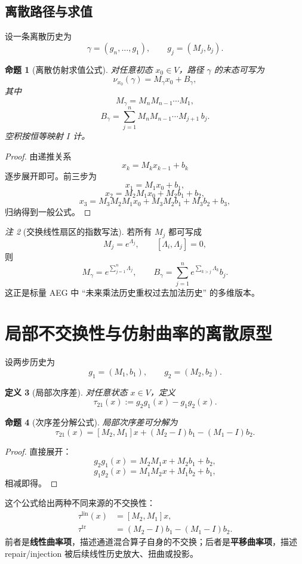 \documentclass[11pt,a4paper]{ctexart}
\newtheorem{definition}{定义}[section]
\newtheorem{proposition}[definition]{命题}
\theoremstyle{remark}
\newtheorem{remark}[definition]{注}
\begin{document}
\subsection{离散路径与求值}

设一条离散历史为
\[
\gamma=(g_n,\dots,g_1),\qquad g_j=(M_j,b_j).
\]

\begin{proposition}[离散仿射求值公式]
对任意初态 $x_0\in V$，路径 $\gamma$ 的末态可写为
\[
\nu_{x_0}(\gamma)=M_\gamma x_0+B_\gamma,
\]
其中
\[
M_\gamma=M_nM_{n-1}\cdots M_1,
\]
\[
B_\gamma=\sum_{j=1}^n M_nM_{n-1}\cdots M_{j+1}\,b_j.
\]
空积按恒等映射 $I$ 计。
\end{proposition}

\begin{proof}
由递推关系
\[
x_k=M_kx_{k-1}+b_k
\]
逐步展开即可。前三步为
\[
x_1=M_1x_0+b_1,
\]
\[
x_2=M_2M_1x_0+M_2b_1+b_2,
\]
\[
x_3=M_3M_2M_1x_0+M_3M_2b_1+M_3b_2+b_3,
\]
归纳得到一般公式。
\end{proof}

\begin{remark}[交换线性扇区的指数写法]
若所有 $M_j$ 都可写成
\[
M_j=e^{\Lambda_j},\qquad [\Lambda_i,\Lambda_j]=0,
\]
则
\[
M_\gamma=e^{\sum_{j=1}^n\Lambda_j},
\qquad
B_\gamma=\sum_{j=1}^n e^{\sum_{k>j}\Lambda_k}b_j.
\]
这正是标量 AEG 中 ``未来乘法历史重权过去加法历史'' 的多维版本。
\end{remark}

\section{局部不交换性与仿射曲率的离散原型}

设两步历史为
\[
g_1=(M_1,b_1),\qquad g_2=(M_2,b_2).
\]

\begin{definition}[局部次序差]
对任意状态 $x\in V$，定义
\[
\tau_{21}(x):=g_2g_1(x)-g_1g_2(x).
\]
\end{definition}

\begin{proposition}[次序差分解公式]
局部次序差可分解为
\[
\tau_{21}(x)
=
[M_2,M_1]x+(M_2-I)b_1-(M_1-I)b_2.
\]
\end{proposition}

\begin{proof}
直接展开：
\[
g_2g_1(x)=M_2M_1x+M_2b_1+b_2,
\]
\[
g_1g_2(x)=M_1M_2x+M_1b_2+b_1,
\]
相减即得。
\end{proof}

这个公式给出两种不同来源的不交换性：
\begin{align*}
\tau^{\mathrm{lin}}(x)&=[M_2,M_1]x,\\
\tau^{\mathrm{tr}}&=(M_2-I)b_1-(M_1-I)b_2.
\end{align*}
前者是\textbf{线性曲率项}，描述通道混合算子自身的不交换；后者是\textbf{平移曲率项}，描述 repair/injection 被后续线性历史放大、扭曲或投影。
\end{document}
